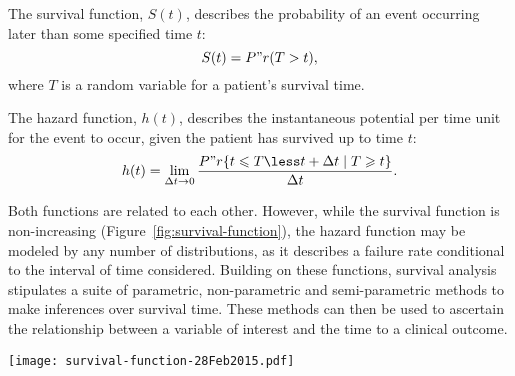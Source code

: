 The survival function, $S(t)$, describes the probability of an event occurring
later than some specified time $t$:
\begin{equation}
  \label{eq:survival-function}
  S(t) = P"r(T > t),
\end{equation}
where $T$ is a random variable for a patient's survival time.

The hazard function, $h(t)$, describes the instantaneous potential per time unit
for the event to occur, given the patient has survived up to time $t$:
\begin{equation}
  \label{eq:hazard-function}
  h(t) = \lim_{\Delta t \to 0}\frac{P"r\{t \leqslant T \less t + \Delta t
    \mid T \geqslant t \}}{\Delta t}.
\end{equation}


Both functions are related to each other.  However, while the survival function
is non-increasing (Figure~\ref{fig:survival-function}), the hazard function may
be modeled by any number of distributions, as it describes a failure rate
conditional to the interval of time considered.  Building on these functions,
survival analysis stipulates a suite of parametric, non-parametric and
semi-parametric methods to make inferences over survival time.  These methods
can then be used to ascertain the relationship between a variable of interest
and the time to a clinical outcome.

\begin{marginfigure}[-5cm]%
  \texttt{[image: survival-function-28Feb2015.pdf]}
  \caption[Survival function]{The survival function, $S(t)$ describes the
    likelihood that a patient will have a lifetime exceeding time $t$.
    \textbf{A:}~The theoretical distribution is non-increasing, and
    characterized by $S(0)=1$ and $S(\infty)=0$.  \textbf{B:}~In practice, the
    estimated survival function, $\hat{S}(t)$, often takes the shape of a step
    function.  Because study periods are never infinite and there may be
    competing risks for failure, it is likely that not all patients will
    experience a clinical outcome by the end of the
    study.}\label{fig:survival-function}%
\end{marginfigure}

